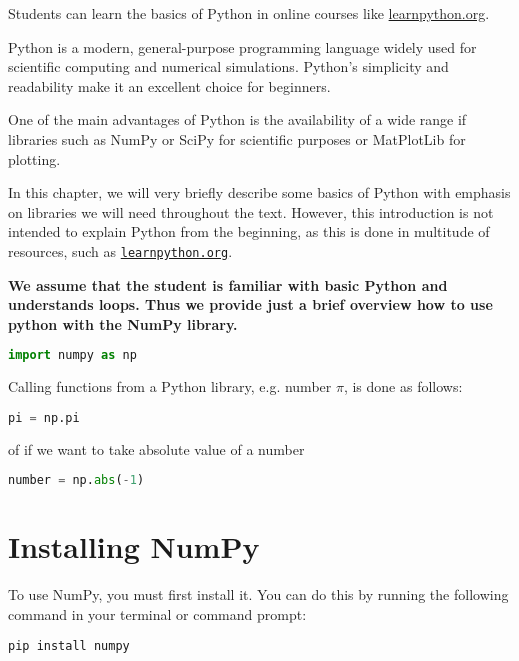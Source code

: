 Students can learn the basics of Python in online courses like \href{https://www.learnpython.org/}{learnpython.org}.

Python is a modern, general-purpose programming language widely used for scientific computing and numerical simulations. Python's simplicity and readability make it an excellent choice for beginners.

One of the main advantages of Python is the availability of a wide range if libraries such as NumPy or SciPy for scientific purposes or MatPlotLib for plotting.

In this chapter, we will very briefly describe some basics of Python with emphasis on libraries we will need throughout the text. However, this introduction is not intended to explain Python from the beginning, as this is done in multitude of resources, such as \href{https://www.learnpython.org/}{\texttt{learnpython.org}}.

\textbf{We assume that the student is familiar with basic Python and understands loops. Thus we provide just a brief overview how to use python with the NumPy library.}

\begin{lstlisting}[language=Python, style=mystyle2]
import numpy as np
\end{lstlisting}


Calling functions from a Python library, e.g. number $\pi$, is done as follows:
\begin{lstlisting}[language=Python, style=mystyle2]
pi = np.pi
\end{lstlisting}
of if we want to take absolute value of a number
\begin{lstlisting}[language=Python, style=mystyle2]
number = np.abs(-1)
\end{lstlisting}



\section{Installing NumPy}
To use NumPy, you must first install it. You can do this by running the following command in your terminal or command prompt:
\begin{lstlisting}[language=Python, style=mystyle2]
pip install numpy
\end{lstlisting}

